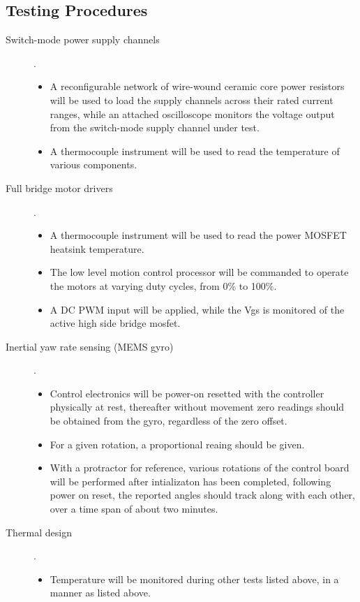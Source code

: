 \documentclass[12pt]{article}
\begin{document}
 \subsection{Testing Procedures}
 \begin{description}
    \item[Switch-mode power supply channels]. 
    \begin{itemize}
      \item A reconfigurable network of wire-wound ceramic core power resistors will be used to load the supply channels across their rated current ranges, while an attached oscilloscope monitors the voltage output from the switch-mode supply channel under test.
      \item A thermocouple instrument will be used to read the temperature of various components.
      \end{itemize}
    \item[Full bridge motor drivers]. 
    \begin{itemize}
      \item A thermocouple instrument will be used to read the power MOSFET heatsink temperature.
      \item The low level motion control processor will be commanded to operate the motors at varying duty cycles, from 0\% to 100\%.
      \item A DC PWM input will be applied, while the Vgs is monitored of the active high side bridge mosfet.
      \end{itemize}
    \item[Inertial yaw rate sensing (MEMS gyro)]. 
    \begin{itemize}
      \item Control electronics will be power-on resetted with the controller physically at rest, thereafter without movement zero readings should be obtained from the gyro, regardless of the zero offset.
      \item For a given rotation, a proportional reaing should be given.
      \item With a protractor for reference, various rotations of the control board will be performed after intializaton has been completed, following power on reset, the reported angles should track along with each other, over a time span of about two minutes.
      \end{itemize}
    \item[Thermal design]. 
    \begin{itemize}
     \item Temperature will be monitored during other tests listed above, in a manner as listed above.
      \end{itemize}
      \end{description}
\end{document}
